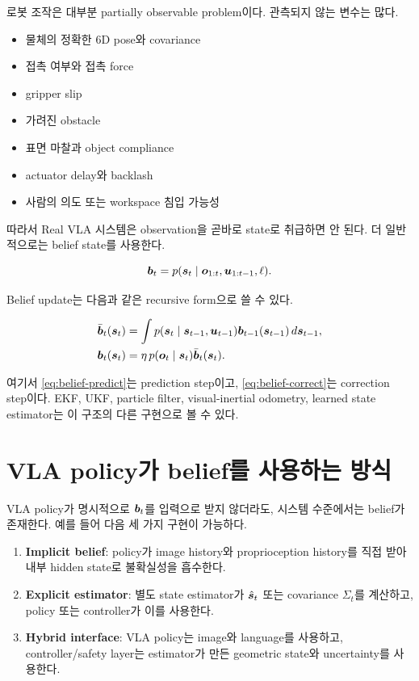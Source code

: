 로봇 조작은 대부분 partially observable problem이다. 관측되지 않는 변수는 많다.

\begin{itemize}
  \item 물체의 정확한 6D pose와 covariance
  \item 접촉 여부와 접촉 force
  \item gripper slip
  \item 가려진 obstacle
  \item 표면 마찰과 object compliance
  \item actuator delay와 backlash
  \item 사람의 의도 또는 workspace 침입 가능성
\end{itemize}

따라서 Real VLA 시스템은 observation을 곧바로 state로 취급하면 안 된다. 더 일반적으로는 belief state를 사용한다.

\begin{equation}
  \bm{b}_t = p(\bm{s}_t \mid \bm{o}_{1:t}, \bm{u}_{1:t-1}, \ell).
  \label{eq:belief-definition}
\end{equation}

Belief update는 다음과 같은 recursive form으로 쓸 수 있다.

\begin{align}
  \bar{\bm{b}}_t(\bm{s}_t) &=
  \int p(\bm{s}_t \mid \bm{s}_{t-1}, \bm{u}_{t-1})
  \bm{b}_{t-1}(\bm{s}_{t-1})\,d\bm{s}_{t-1}, \label{eq:belief-predict}\\
  \bm{b}_t(\bm{s}_t) &=
  \eta\,p(\bm{o}_t \mid \bm{s}_t)\bar{\bm{b}}_t(\bm{s}_t). \label{eq:belief-correct}
\end{align}

여기서 \cref{eq:belief-predict}는 prediction step이고, \cref{eq:belief-correct}는 correction step이다. EKF, UKF, particle filter, visual-inertial odometry, learned state estimator는 이 구조의 다른 구현으로 볼 수 있다.

\section{VLA policy가 belief를 사용하는 방식}

VLA policy가 명시적으로 $\bm{b}_t$를 입력으로 받지 않더라도, 시스템 수준에서는 belief가 존재한다. 예를 들어 다음 세 가지 구현이 가능하다.

\begin{enumerate}
  \item \textbf{Implicit belief}: policy가 image history와 proprioception history를 직접 받아 내부 hidden state로 불확실성을 흡수한다.
  \item \textbf{Explicit estimator}: 별도 state estimator가 $\hat{\bm{s}}_t$ 또는 covariance $\Sigma_t$를 계산하고, policy 또는 controller가 이를 사용한다.
  \item \textbf{Hybrid interface}: VLA policy는 image와 language를 사용하고, controller/safety layer는 estimator가 만든 geometric state와 uncertainty를 사용한다.
\end{enumerate}

